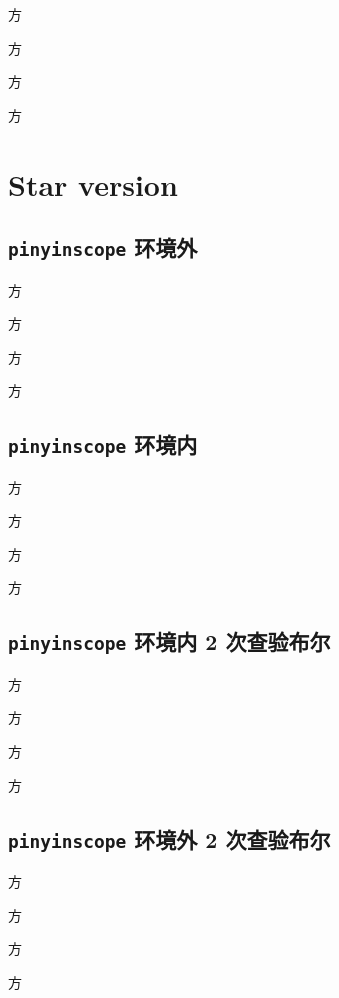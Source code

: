 \documentclass[twocolumn]{article}
\begin{document}
方

方

\disablepinyin

方

方

\newpage

\section{Star version}

\subsection{\texttt{pinyinscope} 环境外}

\enablepinyin

方

方

\disablepinyin*

方

方

\subsection{\texttt{pinyinscope} 环境内}

\begin{pinyinscope}

方

方

\disablepinyin*

方

方

\end{pinyinscope}

\subsection{\texttt{pinyinscope} 环境内 2 次查验布尔}

\begin{pinyinscope}

方

方

\disablepinyin*

方

方

\end{pinyinscope}

\subsection{\texttt{pinyinscope} 环境外 2 次查验布尔}

\enablepinyin

方

方

\disablepinyin*

方

方
\end{document}
